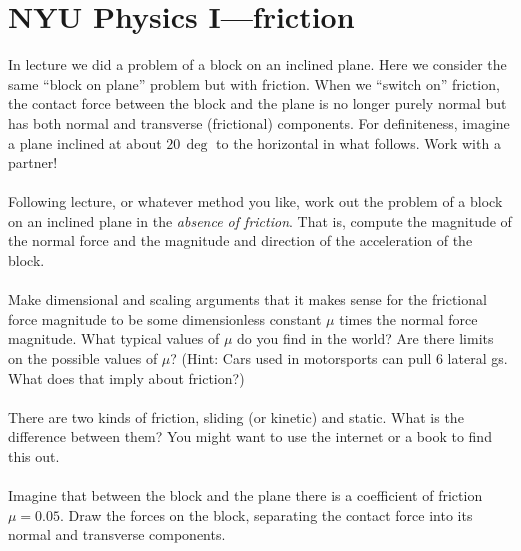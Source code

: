 \documentclass[12pt]{article}
\begin{document}
\section*{NYU Physics I---friction}

In lecture we did a problem of a block on an inclined plane.
Here we consider the same ``block on plane'' problem but with
friction.  When we ``switch on'' friction, the contact force between
the block and the plane is no longer purely normal but has both normal
and transverse (frictional) components.  For definiteness, imagine a
plane inclined at about $20\,\deg$ to the horizontal in what
follows. Work with a partner!

\paragraph{\theproblem}%
Following lecture, or whatever method you like, work out the problem
of a block on an inclined plane in the \emph{absence of friction}.
That is, compute the magnitude of the normal force and the magnitude
and direction of the acceleration of the block.

\paragraph{\theproblem}%
Make dimensional and scaling arguments that it makes sense for the
frictional force magnitude to be some dimensionless constant $\mu$
times the normal force magnitude. What typical values of $\mu$ do you
find in the world? Are there limits on the possible values of $\mu$?
(Hint: Cars used in motorsports can pull 6 lateral gs. What does that
imply about friction?)

\paragraph{\theproblem}%
There are two kinds of friction, sliding (or kinetic) and static. What
is the difference between them? You might want to use the internet or
a book to find this out.

\paragraph{\theproblem}%
Imagine that between the block and the plane there is a coefficient of
friction $\mu=0.05$.  Draw the forces on the block, separating the
contact force into its normal and transverse components.
\end{document}
